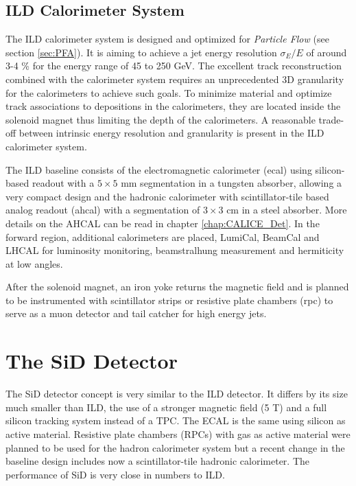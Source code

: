 \subsection{ILD Calorimeter System}

The ILD calorimeter system is designed and optimized for \textit{Particle Flow} (see section \ref{sec:PFA}). It is aiming to achieve a jet energy resolution $\sigma_E/E$ of around 3-4 \% for the energy range of 45 to 250 GeV. The excellent track reconstruction combined with the calorimeter system requires an unprecedented 3D granularity for the calorimeters to achieve such goals. To minimize material and optimize track associations to depositions in the calorimeters, they are located inside the solenoid magnet thus limiting the depth of the calorimeters. A reasonable trade-off between intrinsic energy resolution and granularity is present in the ILD calorimeter system.

The ILD baseline consists of the electromagnetic calorimeter (\acrshort{ecal}) using silicon-bas\-ed readout with a $5 \times 5$ mm segmentation in a tungsten absorber, allowing a very compact design and the hadronic calorimeter with scintillator-tile based analog readout (\acrshort{ahcal}) with a segmentation of $3 \times 3$ cm in a steel absorber. More details on the AHCAL can be read in chapter \ref{chap:CALICE_Det}. In the forward region, additional calorimeters are placed, LumiCal, BeamCal and LHCAL for luminosity monitoring, beamstralhung measurement and hermiticity at low angles.

After the solenoid magnet, an iron yoke returns the magnetic field and is planned to be instrumented with scintillator strips or resistive plate chambers (\acrshort{rpc}) to serve as a muon detector and tail catcher for high energy jets.

\section{The SiD Detector}

The SiD detector concept is very similar to the ILD detector. It differs by its size much smaller than ILD, the use of a stronger magnetic field (5 T) and a full silicon tracking system instead of a TPC. The ECAL is the same using silicon as active material. Resistive plate chambers (RPCs) with gas as active material were planned to be used for the hadron calorimeter system but a recent change in the baseline design includes now a scintillator-tile hadronic calorimeter. The performance of SiD is very close in numbers to ILD.
